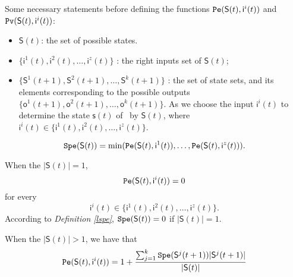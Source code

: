 Some necessary statements before defining the functions ${\tt Pe}(\mathsf{S}(t),\mathsf{ i}^{i}(t))$ and ${\tt Pv}(\mathsf{S}(t),\mathsf{ i}^{i}(t))$:
\begin{itemize}
  \item $\mathsf{S}(t)$: the set of possible states.
  \item $\{\mathsf{ i}^{1}(t),\mathsf{ i}^{2}(t),\ldots, \mathsf{ i}^{z}(t)\}$ : the right inputs set of $\mathsf{S}(t)$;
  \item $\{\mathsf{S}^{1}(t+1),\mathsf{S}^{2}(t+1),\ldots, \mathsf{S}^{k}(t+1)\}$ : the set of state sets, and its elements corresponding to the possible outputs $\{\mathsf{o}^1(t+1),\mathsf{o}^2(t+1),\ldots,\mathsf{o}^k(t+1)\}$. As we choose the input $\mathsf{ i}^{i}(t)$ to determine the state $\mathsf{s}(t)$ of \BCN\ by $\mathsf{S}(t)$, where $\mathsf{ i}^{i}(t) \in \{\mathsf{ i}^{1}(t),\mathsf{ i}^{2}(t),\ldots, \mathsf{ i}^{z}(t)\}$.
\end{itemize} 
\begin{definition} \label{lspe}
 \[{\tt Spe}(\mathsf{S}(t))= \min({\tt Pe}(\mathsf{S}(t), \mathsf{ i}^{1}(t)),\ldots,{\tt Pe}(\mathsf{S}(t), \mathsf{ i}^{z}(t))).\] 
\end{definition}

\begin{definition} \label{spe}

When the $|\mathsf{S}(t)|=1$,
\[{\tt Pe}(\mathsf{S}(t), \mathsf{ i}^{i}(t))=0\]  for every \[\mathsf{ i}^{i}(t) \in \{\mathsf{ i}^{1}(t),\mathsf{ i}^{2}(t),\ldots, \mathsf{ i}^{z}(t)\}.\] According to {\em Definition \ref{lspe}}, ${\tt Spe}(\mathsf{S}(t))=0$ if $|\mathsf{S}(t)|=1$. 

When the $|\mathsf{S}(t)|>1$, 
we have that  
\[{\tt Pe}(\mathsf{S}(t), \mathsf{ i}^{i}(t))=1 +\frac{\sum_{j=1}^k {\tt Spe}(\mathsf{S}^{j}(t+1))|\mathsf{S}^{j}(t+1)|}{ |\mathsf{S}(t)|}\] 
\end{definition}


